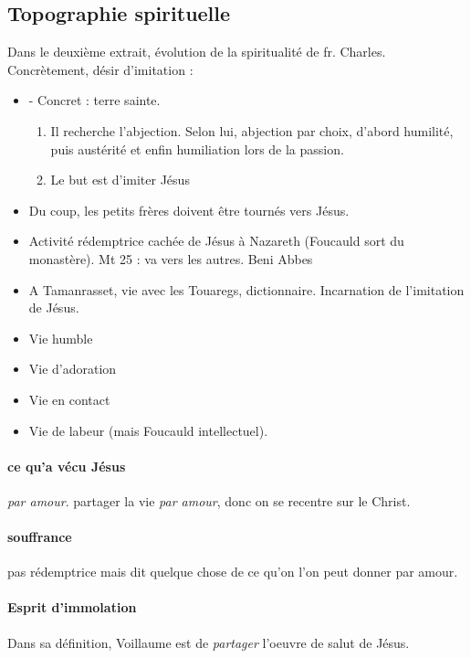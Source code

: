 \subsection{Topographie spirituelle}
Dans le deuxième extrait, évolution de la spiritualité de fr. Charles.
Concrètement, désir d’imitation : 
\begin{itemize}
    \item -	Concret : terre sainte. 
    \begin{enumerate}
        \item  Il recherche l’abjection. Selon lui, abjection par choix, d’abord humilité, puis austérité et enfin humiliation lors de la passion.
 \item 	Le but est d’imiter Jésus
    \end{enumerate}

    \item Du coup, les petits frères doivent être tournés vers Jésus.
    \item Activité rédemptrice cachée de Jésus à Nazareth (Foucauld sort du monastère). Mt 25 : va vers les autres. Beni Abbes
    \item A Tamanrasset, vie avec les Touaregs, dictionnaire. Incarnation de l’imitation de Jésus.
\end{itemize}

\begin{itemize}
    \item Vie humble

   \item 	Vie d’adoration

   \item 	Vie en contact

   \item Vie de labeur (mais Foucauld intellectuel).
\end{itemize}



\paragraph{ce qu'a vécu Jésus} \textit{par amour}. partager la vie \textit{par amour}, donc on se recentre sur le Christ.

\paragraph{souffrance} pas rédemptrice mais dit quelque chose de ce qu'on l'on peut donner par amour.

\paragraph{Esprit d'immolation} Dans sa définition, Voillaume est de \textit{partager} l'oeuvre de salut de Jésus.

